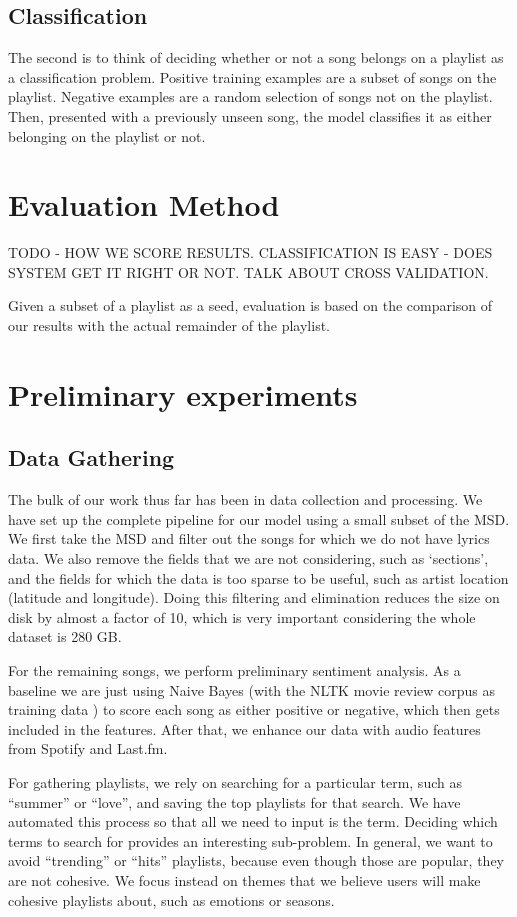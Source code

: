 \documentclass[10pt,journal,compsoc]{IEEEtran}
\begin{document}
\subsection{Classification}
The second is to think of deciding whether or not a song belongs on a playlist as a classification problem. Positive training examples are a subset of songs on the playlist. Negative examples are a random selection of songs not on the playlist. Then, presented with a previously unseen song, the model classifies it as either belonging on the playlist or not.

\section{Evaluation Method}
TODO - HOW WE SCORE RESULTS. CLASSIFICATION IS EASY - DOES SYSTEM GET IT RIGHT OR NOT. TALK ABOUT CROSS VALIDATION.

Given a subset of a playlist as a seed, evaluation is based on the comparison of our results with the actual remainder of the playlist.

\section{Preliminary experiments}

\subsection{Data Gathering}
The bulk of our work thus far has been in data collection and processing. We have set up the complete pipeline for our model using a small subset of the MSD. We first take the MSD and filter out the songs for which we do not have lyrics data. We also remove the fields that we are not considering, such as `sections', and the fields for which the data is too sparse to be useful, such as artist location (latitude and longitude). Doing this filtering and elimination reduces the size on disk by almost a factor of 10, which is very important considering the whole dataset is 280 GB.

For the remaining songs, we perform preliminary sentiment analysis. As a baseline we are just using Naive Bayes (with the NLTK movie review corpus as training data \cite{nltk}) to score each song as either positive or negative, which then gets included in the features. After that, we enhance our data with audio features from Spotify and Last.fm.

For gathering playlists, we rely on searching for a particular term, such as ``summer'' or ``love'', and saving the top playlists for that search. We have automated this process so that all we need to input is the term. Deciding which terms to search for provides an interesting sub-problem. In general, we want to avoid ``trending'' or ``hits'' playlists, because even though those are popular, they are not cohesive. We focus instead on themes that we believe users will make cohesive playlists about, such as emotions or seasons.
\end{document}
